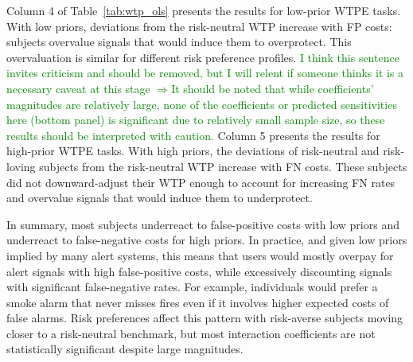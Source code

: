 \documentclass[12pt,a4paper]{article}
\begin{document}
Column 4 of Table~\ref{tab:wtp_ols} presents the results for low-prior WTPE tasks. With low priors, deviations from the risk-neutral WTP increase with FP costs: subjects overvalue signals that would induce them to overprotect. This overvaluation is similar for different risk preference profiles. 
\textcolor{green}{I think this sentence invites criticism and should be removed, but I will relent if someone thinks it is a necessary caveat at this stage $\Rightarrow$It should be noted that while coefficients' magnitudes are relatively large, none of the coefficients or predicted sensitivities here (bottom panel) is significant due to relatively small sample size, so these results should be interpreted with caution. }  Column 5 presents the results for high-prior WTPE tasks. With high priors, the deviations of risk-neutral and risk-loving subjects from the risk-neutral WTP increase with FN costs. These subjects did not downward-adjust their WTP enough to account for increasing FN rates and overvalue signals that would induce them to underprotect. 

In summary, most subjects underreact to false-positive costs with low priors and underreact to false-negative costs for high priors. In practice, and given low priors implied by many alert systems, this means that users would mostly overpay for alert signals with high false-positive costs, while excessively discounting signals with significant false-negative rates. For example, individuals would prefer a smoke alarm that never misses fires even if it involves higher expected costs of false alarms. Risk preferences affect this pattern with risk-averse subjects moving closer to a risk-neutral benchmark, but most interaction coefficients are not statistically significant despite large magnitudes.

\end{document}
